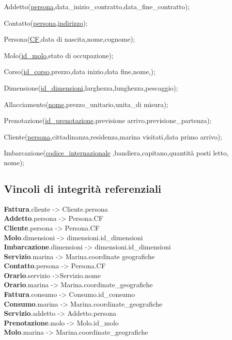 Addetto(\underline{persona},data\_inizio\_contratto,data\_fine\_contratto);

Contatto(\underline{persona,indirizzo});

Persona(\underline{CF},data di nascita,nome,cognome);

Molo(\underline{id\_molo},stato di occupazione);

Corso(\underline{id\_corso},prezzo,data inizio,data fine,nome,);

Dimensione(\underline{id\_dimensioni},larghezza,lunghezza,pescaggio);

Allacciamento(\underline{nome},prezzo\_unitario,unita\_di misura);

Prenotazione(\underline{id\_prenotazione},previsione arrivo,previsione\_partenza);

Cliente(\underline{persona},cittadinanza,residenza,marina visitati,data primo arrivo);

Imbarcazione(\underline{codice\_internazionale} ,bandiera,capitano,quantità posti letto, nome);


\subsection{Vincoli di integrità referenziali}

\textbf{Fattura}.cliente -> Cliente.persona\\
\textbf{Addetto}.persona -> Persona.CF\\
\textbf{Cliente}.persona -> Persona.CF\\
\textbf{Molo}.dimensioni -> dimensioni.id\_dimensioni\\
\textbf{Imbarcazione}.dimensioni -> dimensioni.id\_dimensioni\\
\textbf{Servizio}.marina -> Marina.coordinate geografiche\\
\textbf{Contatto}.persona -> Persona.CF\\
\textbf{Orario}.servizio ->Servizio.nome\\
\textbf{Orario}.marina -> Marina.coordinate\_geografiche\\
\textbf{Fattura}.consumo -> Consumo.id\_consumo\\
\textbf{Consumo}.marina -> Marina.coordinate\_geografiche\\
\textbf{Servizio}.addetto -> Addetto.persona\\
\textbf{Prenotazione}.molo -> Molo.id\_molo\\
\textbf{Molo}.marina -> Marina.coordinate\_geografiche\\
